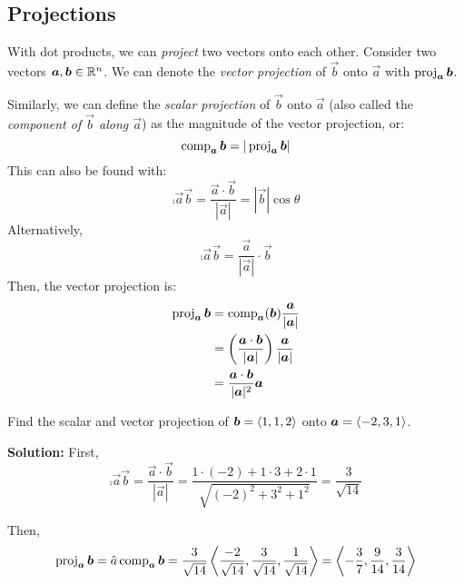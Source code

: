 \subsection{Projections}
With dot products, we can \textit{project} two vectors onto each other. Consider two vectors \(\boldsymbol{a}, \boldsymbol{b} \in \mathbb{R}^n\). We can denote the \textit{vector projection} of \(\vec b\) onto \(\vec a\) with \(\operatorname{proj}_{\boldsymbol{a}}\boldsymbol{b}\). \par 
Similarly, we can define the \textit{scalar projection} of \(\vec b\) onto \(\vec a\) (also called the \textit{component of \(\vec b\) along \(\vec a\)}) as the magnitude of the vector projection, or:
\[\operatorname{comp}_{\boldsymbol{a}}\boldsymbol{b}=|\operatorname{proj}_{\boldsymbol{a}}\boldsymbol{b}|\]
This can also be found with:
\[\comp{\vec a}{\vec b} = \frac{\vec a\cdot \vec b}{|\vec a|} = |\vec b|\cos\theta \]
Alternatively,
\[\comp{\vec a}{\vec b}= \frac{\vec a}{|\vec a|}\cdot \vec b\]
Then, the vector projection is:
\begin{align*}
    \operatorname{proj}_{\boldsymbol{a}}\boldsymbol{b}&=\operatorname{comp}_{\boldsymbol{a}}(\boldsymbol{b})\frac{\boldsymbol{a}}{|\boldsymbol{a}|} \\ &= \left(\frac{\boldsymbol{a}\cdot \boldsymbol{b}}{|\boldsymbol{a}|}\right) \frac{\boldsymbol{a}}{|\boldsymbol{a}|} \\
    &= \frac{\boldsymbol{a} \cdot \boldsymbol{b}}{|\boldsymbol{a}|^2}\boldsymbol{a}
\end{align*}
\begin{example}
    Find the scalar and vector projection of \(\boldsymbol{b} = \left\langle1,1,2\right\rangle\) onto \(\boldsymbol{a} =\left\langle-2, 3, 1\right\rangle\). \par
    \textbf{Solution: }First, 
    \[\comp{\vec a}{\vec b} = \frac{\vec a\cdot \vec b}{|\vec a|} = \frac{1\cdot (-2) + 1\cdot 3 + 2\cdot 1}{\sqrt{(-2)^2+3^2+1^2}} = \frac{3}{\sqrt{14}}\]
\end{example}
Then, \[\operatorname{proj}_{\boldsymbol{a}}\boldsymbol{b} = \hat{a}\operatorname{comp}_{\boldsymbol{a}}\boldsymbol{b} = \frac{3}{\sqrt{14}}\left\langle\frac{-2}{\sqrt{14}}, \frac{3}{\sqrt{14}},\frac{1}{\sqrt{14}}\right\rangle = \left\langle-\frac{3}{7}, \frac{9}{14}, \frac{3}{14}\right\rangle\]

